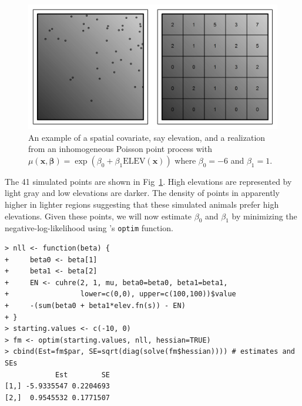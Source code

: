 \begin{figure}%
\centering
\includegraphics[width=\textwidth]{Ch11-Statespace/figs/heteroPlots}
\caption{An example of a spatial covariate, say elevation, and a
  realization from an inhomogeneous Poisson point process with
  $\mu(\mathbf{x}, \bm{\beta}) = \exp(\beta_0 + \beta_1
  \mbox{ELEV}(\mathbf{x}))$ where $\beta_0=-6$ and $\beta_1=1$.}
\label{state-space.fig.hetero}
\end{figure}

The 41 simulated points are shown in
Fig~\ref{state-space.fig.hetero}. High elevations
are represented by light gray and low elevations are darker. The
density of points in apparently higher in lighter regions
suggesting that these simulated animals prefer high
elevations.  %
Given these points, we will now estimate $\beta_0$ and $\beta_1$ by
minimizing the negative-log-likelihood using \R's \verb+optim+
function.

\begin{small}
\begin{verbatim}
> nll <- function(beta) {
+     beta0 <- beta[1]
+     beta1 <- beta[2]
+     EN <- cuhre(2, 1, mu, beta0=beta0, beta1=beta1,
+                 lower=c(0,0), upper=c(100,100))$value
+     -(sum(beta0 + beta1*elev.fn(s)) - EN)
+ }
> starting.values <- c(-10, 0)
> fm <- optim(starting.values, nll, hessian=TRUE)
> cbind(Est=fm$par, SE=sqrt(diag(solve(fm$hessian)))) # estimates and SEs
            Est        SE
[1,] -5.9335547 0.2204693
[2,]  0.9545532 0.1771507
\end{verbatim}
\end{small}

